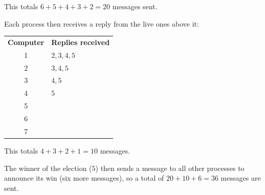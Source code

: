 This totals $6 + 5 + 4 + 3 + 2 = 20$ messages sent.

Each process then receives a reply from the live ones above it:

\begin{center}
  \begin{tabular}{cl}
    \textbf{Computer} & \textbf{Replies received}\\
      1 & $2,3,4,5$\\
      2 & $3,4,5$\\
      3 & $4,5$\\
      4 & $5$\\
      5 & \\
      6 & \\
      7 & \\
  \end{tabular}
\end{center}

This totals $4 + 3 + 2 + 1 = 10$ messages.

The winner of the election ($5$) then sends a message to all other processes to
announce its win (six more messages), so a total of $20 + 10 + 6 = 36$ messages
are sent.
